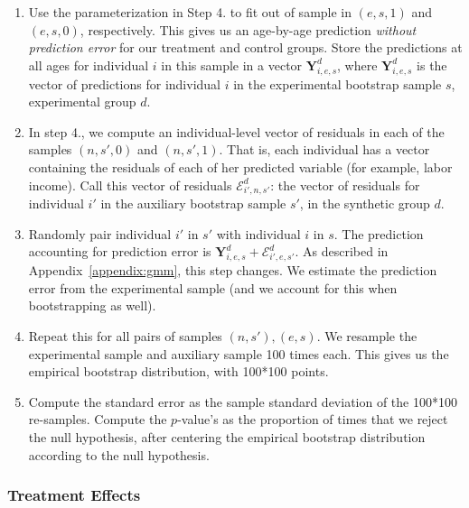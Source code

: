\begin{enumerate}
\item Use the parameterization in Step 4. to fit out of sample in $(e,s,1)$ and $(e,s,0)$, respectively. This gives us an age-by-age prediction \textit{without prediction error} for our treatment and control groups. Store the predictions at all ages for individual $i$ in this sample in a vector $\bm{Y}_{i,e,s}^d$, where $\bm{Y}_{i,e,s}^d$ is the vector of predictions for individual $i$ in the experimental bootstrap sample $s$, experimental group $d$.

\item In step 4., we compute an individual-level vector of residuals in each of the samples $(n,s',0)$ and $(n,s',1)$. That is, each individual has a vector containing the residuals of each of her predicted variable (for example, labor income). Call this vector of residuals $\bm{\mathcal{E}}_{i',n,s'}^d$: the vector of residuals for individual $i'$ in the auxiliary bootstrap sample $s'$, in the synthetic group $d$.

\item Randomly pair individual $i'$ in $s'$ with individual $i$ in $s$. The prediction accounting for prediction error is $\bm{Y}_{i,e,s}^d + \bm{\mathcal{E}}_{i',e,s'}^d$. As described in Appendix~\ref{appendix:gmm}, this step changes. We estimate the prediction error from the experimental sample (and we account for this when bootstrapping as well).

\item Repeat this for all pairs of samples $(n,s'), (e,s)$. We resample the experimental sample and auxiliary sample 100 times each. This gives us the empirical bootstrap distribution, with 100*100 points.

\item Compute the standard error as the sample standard deviation of the 100*100 re-samples. Compute the $p$-value's as the proportion of times that we reject the null hypothesis, after centering the empirical bootstrap distribution according to the null hypothesis.

\end{enumerate}

\subsubsection{Treatment Effects}\label{little-TE}


